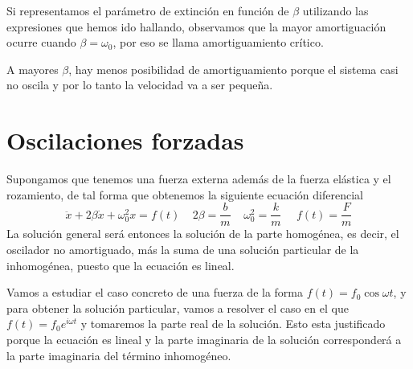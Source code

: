 Si representamos el parámetro de extinción en función de $\beta$ utilizando las expresiones que hemos ido hallando, observamos que la mayor amortiguación ocurre cuando $\beta = \omega_0$, por eso se llama amortiguamiento crítico.

A mayores $\beta$, hay menos posibilidad de amortiguamiento porque el sistema casi no oscila y por lo tanto la velocidad va a ser pequeña.

\section{Oscilaciones forzadas}
Supongamos que tenemos una fuerza externa además de la fuerza elástica y el rozamiento, de tal forma que obtenemos la siguiente ecuación diferencial
\begin{equation} \label{6.1.1}
    \ddot{x} + 2\beta\dot{x} + \omega_0^2 x = f(t) \ \ \ \ \ 2\beta = \frac{b}{m} \ \ \ \ \ \omega_0^2 = \frac{k}{m}  \ \ \ \ \ \ f(t) = \frac{F}{m}
\end{equation}
La solución general será entonces la solución de la parte homogénea, es decir, el oscilador no amortiguado, más la suma de una solución particular de la inhomogénea, puesto que la ecuación es lineal.

Vamos a estudiar el caso concreto de una fuerza de la forma $f(t) = f_0 \cos \omega t$, y para obtener la solución particular, vamos a resolver el caso en el que $f(t) = f_0 e^{i\omega t}$ y tomaremos la parte real de la solución. Esto esta justificado porque la ecuación es lineal y la parte imaginaria de la solución corresponderá a la parte imaginaria del término inhomogéneo.

